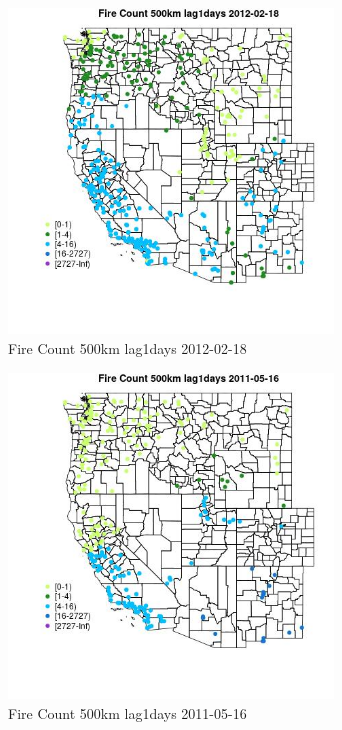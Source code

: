 \begin{figure} 
\centering  
\includegraphics[width=0.77\textwidth]{Code_Outputs/Report_ML_input_PM25_Step4_part_f_de_duplicated_aves_prioritize_24hr_obswNAs_MapObsFire_Count_500km_lag1days2012-02-18.jpg} 
\caption{\label{fig:Report_ML_input_PM25_Step4_part_f_de_duplicated_aves_prioritize_24hr_obswNAsMapObsFire_Count_500km_lag1days2012-02-18}Fire Count 500km lag1days 2012-02-18} 
\end{figure} 
 

\begin{figure} 
\centering  
\includegraphics[width=0.77\textwidth]{Code_Outputs/Report_ML_input_PM25_Step4_part_f_de_duplicated_aves_prioritize_24hr_obswNAs_MapObsFire_Count_500km_lag1days2011-05-16.jpg} 
\caption{\label{fig:Report_ML_input_PM25_Step4_part_f_de_duplicated_aves_prioritize_24hr_obswNAsMapObsFire_Count_500km_lag1days2011-05-16}Fire Count 500km lag1days 2011-05-16} 
\end{figure} 
 

